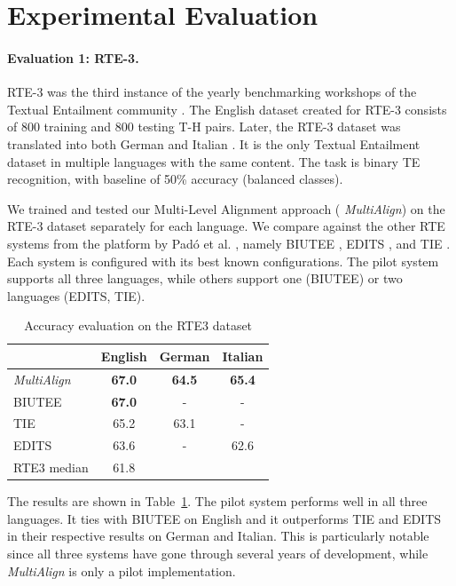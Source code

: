 \documentclass[11pt,a4paper]{article}
\begin{document}
\section{Experimental Evaluation} 
 
\paragraph{Evaluation 1: RTE-3.}
RTE-3 was the third instance of the yearly benchmarking workshops of
the Textual Entailment community
\cite{giampiccolo07:_third_pascal_recog_textual_entail_chall}. The
English dataset created for RTE-3 consists of 800 training and 800
testing T-H pairs. Later, the RTE-3 dataset was translated into both
German and Italian \cite{Magnini:2014}. %
It is the only Textual Entailment dataset in multiple languages with
the same content. The task is binary TE recognition, with baseline of
50\% accuracy (balanced classes).

We trained and tested our Multi-Level Alignment approach ({\em
  MultiAlign}) on the RTE-3 dataset separately for each language. We
compare against the other RTE systems from the platform by Pad\'o et
al. , namely BIUTEE \cite{Stern:2012}, EDITS
\cite{Kouylekov:2010}, and TIE \cite{Wang:2009}. Each system is
configured with its best known configurations. The pilot system
supports all three languages, while others support one (BIUTEE) or
two languages (EDITS, TIE).

\begin{table}[t!]
\centering
\begin{tabular}{l|ccc}
          &   English   &   German   &   Italian \\
\hline
{\em MultiAlign}&   \textbf{67.0}      &   \textbf{64.5}    &  \textbf{65.4}  \\
BIUTEE        &   \textbf{67.0}      &     -       &     -    \\
TIE           &   65.2       &   63.1    &     -    \\ 
EDITS         &   63.6      &     -       &  62.6  \\ \hline
RTE3 median   &   61.8      &             &          \\

\end{tabular}
\caption{Accuracy evaluation on the RTE3 dataset}
\label{table:rte3}
\end{table}

The results are shown in Table~\ref{table:rte3}. The pilot system
performs well in all three languages. It ties with BIUTEE on English
and it outperforms TIE and EDITS in their respective results on German
and Italian. This is particularly notable since all three systems have
gone through several years of development, while {\em MultiAlign} is
only a pilot implementation. 
\end{document}

